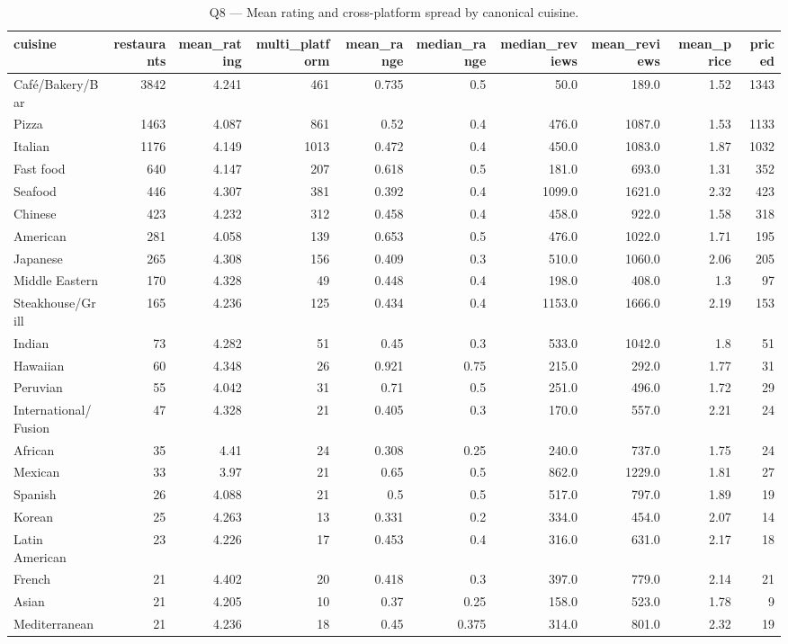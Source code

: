 \begin{table}[ht]
\centering
\caption{Q8 — Mean rating and cross-platform spread by canonical cuisine.}
\label{tab:q8_cuisine_consistency}
{\tiny
\begin{tabular}{lrrrrrrrrr}
\toprule
cuisine & restaurants & mean\_rating & multi\_platform & mean\_range & median\_range & median\_reviews & mean\_reviews & mean\_price & priced \\
\midrule
Café/Bakery/Bar & 3842 & 4.241 & 461 & 0.735 & 0.5 & 50.0 & 189.0 & 1.52 & 1343 \\
Pizza & 1463 & 4.087 & 861 & 0.52 & 0.4 & 476.0 & 1087.0 & 1.53 & 1133 \\
Italian & 1176 & 4.149 & 1013 & 0.472 & 0.4 & 450.0 & 1083.0 & 1.87 & 1032 \\
Fast food & 640 & 4.147 & 207 & 0.618 & 0.5 & 181.0 & 693.0 & 1.31 & 352 \\
Seafood & 446 & 4.307 & 381 & 0.392 & 0.4 & 1099.0 & 1621.0 & 2.32 & 423 \\
Chinese & 423 & 4.232 & 312 & 0.458 & 0.4 & 458.0 & 922.0 & 1.58 & 318 \\
American & 281 & 4.058 & 139 & 0.653 & 0.5 & 476.0 & 1022.0 & 1.71 & 195 \\
Japanese & 265 & 4.308 & 156 & 0.409 & 0.3 & 510.0 & 1060.0 & 2.06 & 205 \\
Middle Eastern & 170 & 4.328 & 49 & 0.448 & 0.4 & 198.0 & 408.0 & 1.3 & 97 \\
Steakhouse/Grill & 165 & 4.236 & 125 & 0.434 & 0.4 & 1153.0 & 1666.0 & 2.19 & 153 \\
Indian & 73 & 4.282 & 51 & 0.45 & 0.3 & 533.0 & 1042.0 & 1.8 & 51 \\
Hawaiian & 60 & 4.348 & 26 & 0.921 & 0.75 & 215.0 & 292.0 & 1.77 & 31 \\
Peruvian & 55 & 4.042 & 31 & 0.71 & 0.5 & 251.0 & 496.0 & 1.72 & 29 \\
International/Fusion & 47 & 4.328 & 21 & 0.405 & 0.3 & 170.0 & 557.0 & 2.21 & 24 \\
African & 35 & 4.41 & 24 & 0.308 & 0.25 & 240.0 & 737.0 & 1.75 & 24 \\
Mexican & 33 & 3.97 & 21 & 0.65 & 0.5 & 862.0 & 1229.0 & 1.81 & 27 \\
Spanish & 26 & 4.088 & 21 & 0.5 & 0.5 & 517.0 & 797.0 & 1.89 & 19 \\
Korean & 25 & 4.263 & 13 & 0.331 & 0.2 & 334.0 & 454.0 & 2.07 & 14 \\
Latin American & 23 & 4.226 & 17 & 0.453 & 0.4 & 316.0 & 631.0 & 2.17 & 18 \\
French & 21 & 4.402 & 20 & 0.418 & 0.3 & 397.0 & 779.0 & 2.14 & 21 \\
Asian & 21 & 4.205 & 10 & 0.37 & 0.25 & 158.0 & 523.0 & 1.78 & 9 \\
Mediterranean & 21 & 4.236 & 18 & 0.45 & 0.375 & 314.0 & 801.0 & 2.32 & 19 \\
\bottomrule
\end{tabular}
}
\end{table}
